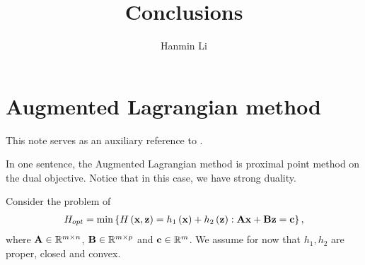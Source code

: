 \documentclass{article}
\title{Conclusions}
\author{Hanmin Li}
\begin{document}
\maketitle

\tableofcontents

\section{Augmented Lagrangian method}
This note serves as an auxiliary reference to \cite[Chapter 15.1]{beck2017first}.

\begin{tcolorbox}[colback=blue!10, colframe=black, boxrule=0.5pt, width=\textwidth]
    In one sentence, the Augmented Lagrangian method is proximal point method on the dual objective. 
    Notice that in this case, we have strong duality.
\end{tcolorbox}

Consider the problem of 
\begin{align}
    \label{eq:objective}
    H_{opt} = \min \left\{H\left(\mathbf{x}, \mathbf{z}\right) = h_1\left(\mathbf{x}\right) + h_2\left(\mathbf{z}\right): \mathbf{A} \mathbf{x} + \mathbf{B} \mathbf{z} = \mathbf{c}\right\},
\end{align}
where $\mathbf{A} \in \mathbb{R}^{m \times n}$, $\mathbf{B} \in \mathbb{R}^{m \times p}$ and $\mathbf{c} \in \mathbb{R}^m$.
We assume for now that $h_1, h_2$ are proper, closed and convex.
\end{document}

